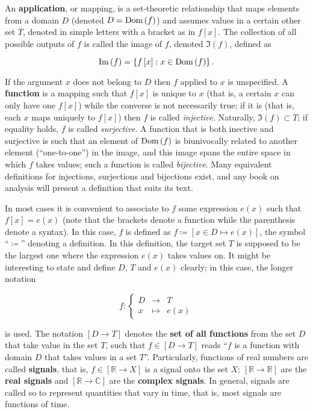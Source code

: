 	An \textbf{application}, or mapping, is a set-theoretic relationship that maps elements from a domain $D$ (denoted $D = \operatorname{Dom}\left(f\right)$) and assumes values in a certain other set $T$, denoted in simple letters with a bracket as in $f\left[x\right]$. The collection of all possible outputs of $f$ is called the image of $f$, denoted $\Im\left(f\right)$, defined as

\begin{equation} \operatorname{Im}\left(f\right) = \left\{ f\left[x\right]: x\in\operatorname{Dom}\left(f\right)\right\}. \label{eq:def_image}\end{equation}

	If the argument $x$ does not belong to $D$ then $f$ applied to $x$ is unspecified. A \textbf{function} is a mapping such that $f\left[x\right]$ is unique to $x$ (that is, a certain $x$ can only have one $f\left[x\right]$) while the converse is not necessarily true; if it is (that is, each $x$ maps uniquely to $f\left[x\right]$) then $f$ is called \textit{injective}. Naturally, $\Im\left(f\right)\subset T$; if equality holds, $f$ is called \textit{surjective}. A function that is both inective and surjective is such that an element of $\operatorname{Dom}\left(f\right)$ is biunivocally related to another element (``one-to-one'') in the image, and this image spans the entire space in which $f$ takes values; such a function is called \textit{bijective}. Many equivalent definitions for injections, surjections and bijections exist, and any book on analysis will present a definition that suits its text.

	 In most cases it is convenient to associate to $f$ some expression $e(x)$ such that $f\left[x\right] = e(x)$ (note that the brackets denote a function while the parenthesis denote a syntax). In this case, $f$ is defined as $f\coloneq \left[x\in D\mapsto e(x)\right]$, the symbol ``$\coloneq$'' denoting a definition. In this definition, the target set $T$ is supposed to be the largest one where the expression $e(x)$ takes values on. It might be interesting to state and define $D$, $T$ and $e(x)$ clearly; in this case, the longer notation

\begin{equation} f: \left\{\begin{array}{rcl} D &\to& T \\[3mm] x &\mapsto& e(x) \end{array}\right. \end{equation}

	\noindent is used. The notation $\left[D\to T\right]$ denotes the \textbf{set of all functions} from the set $D$ that take value in the set $T$, such that $f\in\left[D\to T\right]$ reads ``$f$ is a function with domain $D$ that takes values in a set $T$''. Particularly, functions of real numbers are called \textbf{signals}, that is, $f\in\left[\mathbb{R}\to X\right]$ is a signal onto the set $X$; $\left[\mathbb{R}\to\mathbb{R}\right]$ are the \textbf{real signals} and $\left[\mathbb{R}\to\mathbb{C}\right]$ are the \textbf{complex signals}. In general, signals are called so to represent quantities that vary in time, that is, most signals are functions of time.

